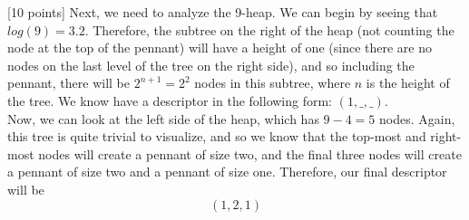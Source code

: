 \documentclass[12pt]{article}
\newcounter{ques}
\newenvironment{question}{\stepcounter{ques}{\noindent\bf Question \arabic{ques}:}}{\vspace{5mm}}
\begin{document}
\begin{question}[10 points]
Next, we need to analyze the 9-heap. We can begin by seeing that $log(9)=3.2$. Therefore, the subtree on the right of the heap (not counting the node at the top of the pennant) will have a height of one (since there are no nodes on the last level of the tree on the right side), and so including the pennant, there will be $2^{n+1}=2^2$ nodes in this subtree, where $n$ is the height of the tree. We know have a descriptor in the following form: $(1,\_,\_)$.\\
Now, we can look at the left side of the heap, which has $9-4=5$ nodes. Again, this tree is quite trivial to visualize, and so we know that the top-most and right-most nodes will create a pennant of size two, and the final three nodes will create a pennant of size two and a pennant of size one. Therefore, our final descriptor will be
$$(1,2,1)$$\\\\


\end{question}
\end{document}
